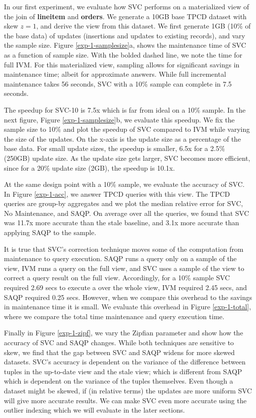 In our first experiment, we evaluate how SVC performs on a materialized view of the join of \textbf{lineitem} and \textbf{orders}.
We generate a 10GB base TPCD dataset with skew $z=1$, and derive the view from this dataset.
We first generate 1GB (10\% of the base data) of updates (insertions and updates to existing records), and vary the sample size.
Figure \ref{exp-1-samplesize}a, shows the maintenance time of SVC as a function of sample size.
With the bolded dashed line, we note the time for full IVM. 
For this materialized view, sampling allows for significant savings in maintenance time; albeit for approximate answers.
While full incremental maintenance takes 56 seconds, SVC with a 10\% sample can complete in 7.5 seconds.

The speedup for SVC-10 is 7.5x which is far from ideal on a 10\% sample.
In the next figure, Figure \ref{exp-1-samplesize}b, we evaluate this speedup. 
We fix the sample size to 10\% and plot the speedup of SVC compared to IVM while varying the size of the updates.
On the x-axis is the update size as a percentage of the base data.
For small update sizes, the speedup is smaller, 6.5x for a 2.5\% (250GB) update size.
As the update size gets larger, SVC becomes more efficient, since for a 20\% update size (2GB), the speedup is 10.1x. 

At the same design point with a 10\% sample, we evaluate the accuracy of SVC.
In Figure \ref{exp-1-acc}, we answer TPCD queries with this view.
The TPCD queries are group-by aggregates and we plot the median relative error for SVC, No Maintenance, and SAQP.
On average over all the queries, we found that SVC was 11.7x more accurate than the stale baseline, and 3.1x more accurate than applying SAQP to the sample.

It is true that SVC's correction technique moves some of the computation from maintenance to query execution.
SAQP runs a query only on a sample of the view, IVM runs a query on the full view, and SVC uses a sample of the view to correct a query result on the full view.
Accordingly, for a 10\% sample SVC required 2.69 secs to execute a \sumfunc over the whole view, IVM required 2.45 secs, and  SAQP required 0.25 secs.
However, when we compare this overhead to the savings in maintenance time it is small.
We evaluate this overhead in Figure \ref{exp-1-total}, where we compare the total time maintenance and query execution time.

Finally in Figure \ref{exp-1-zipf}, we vary the Zipfian parameter and show how the accuracy of SVC and SAQP changes.
While both techniques are sensitive to skew, we find that the gap between SVC and SAQP widens for more skewed datasets. 
SVC's accuracy is dependent on the variance of the difference between tuples in the up-to-date view and the stale view; which is different from SAQP which is dependent on the variance of the tuples themselves. 
Even though a dataset might be skewed, if (in relative terms) the updates are more uniform SVC will give more accurate results.
We can make SVC even more accurate using the outlier indexing which we will evaluate in the later sections.

